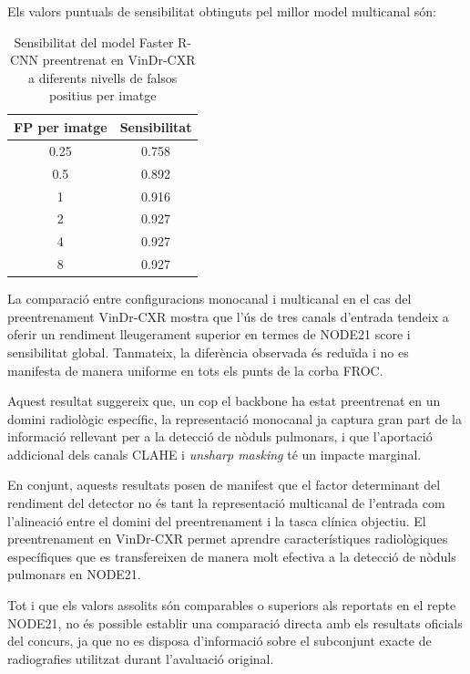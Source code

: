 \documentclass[conference]{IEEEtran}
\begin{document}
Els valors puntuals de sensibilitat obtinguts pel millor model multicanal són:


\begin{table}[H]
\centering
\footnotesize
\caption{Sensibilitat del model Faster R-CNN preentrenat en VinDr-CXR a diferents nivells de falsos positius per imatge}
\label{tab:sensitivity_vindr}
\setlength{\tabcolsep}{6pt}
\begin{tabular}{cc}
\toprule
\textbf{FP per imatge} & \textbf{Sensibilitat} \\
\midrule
0.25 & 0.758 \\
0.5  & 0.892 \\
1    & 0.916 \\
2    & 0.927 \\
4    & 0.927 \\
8    & 0.927 \\
\bottomrule
\end{tabular}
\end{table}


La comparació entre configuracions monocanal i multicanal en el cas del
preentrenament VinDr-CXR mostra que l’ús de tres canals d’entrada tendeix a oferir
un rendiment lleugerament superior en termes de NODE21 score i sensibilitat
global. Tanmateix, la diferència observada és reduïda i no es manifesta de manera
uniforme en tots els punts de la corba FROC.

Aquest resultat suggereix que, un cop el backbone ha estat preentrenat en un
domini radiològic específic, la representació monocanal ja captura gran part de
la informació rellevant per a la detecció de nòduls pulmonars, i que l’aportació
addicional dels canals CLAHE i \textit{unsharp masking} té un impacte marginal.


En conjunt, aquests resultats posen de manifest que el factor determinant del
rendiment del detector no és tant la representació multicanal de l’entrada com
l’alineació entre el domini del preentrenament i la tasca clínica objectiu. El
preentrenament en VinDr-CXR permet aprendre característiques radiològiques
específiques que es transfereixen de manera molt efectiva a la detecció de
nòduls pulmonars en NODE21.

Tot i que els valors assolits són comparables o superiors als reportats en el
repte NODE21, no és possible establir una comparació directa amb els resultats
oficials del concurs, ja que no es disposa d’informació sobre el subconjunt
exacte de radiografies utilitzat durant l’avaluació original.
\end{document}
